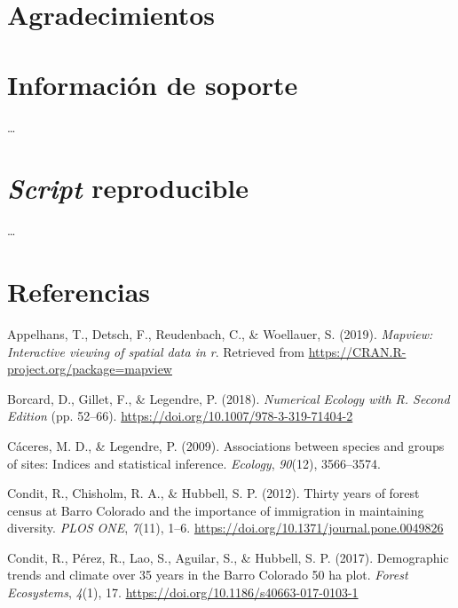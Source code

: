 \documentclass[11pt,]{article}
\begin{document}
\section{Agradecimientos}\label{agradecimientos}

\section{Información de soporte}\label{informaciuxf3n-de-soporte}

\ldots

\section{\texorpdfstring{\emph{Script}
reproducible}{Script reproducible}}\label{script-reproducible}

\ldots

\section*{Referencias}\label{referencias}

\hypertarget{refs}{}
\hypertarget{ref-cita_mapview}{}
Appelhans, T., Detsch, F., Reudenbach, C., \& Woellauer, S. (2019).
\emph{Mapview: Interactive viewing of spatial data in r}. Retrieved from
\url{https://CRAN.R-project.org/package=mapview}

\hypertarget{ref-borcard_legendre}{}
Borcard, D., Gillet, F., \& Legendre, P. (2018). \emph{Numerical Ecology
with R. Second Edition} (pp. 52--66).
\url{https://doi.org/10.1007/978-3-319-71404-2}

\hypertarget{ref-caceres2009associations}{}
Cáceres, M. D., \& Legendre, P. (2009). Associations between species and
groups of sites: Indices and statistical inference. \emph{Ecology},
\emph{90}(12), 3566--3574.

\hypertarget{ref-condit_et_al_2012}{}
Condit, R., Chisholm, R. A., \& Hubbell, S. P. (2012). Thirty years of
forest census at Barro Colorado and the importance of immigration in
maintaining diversity. \emph{PLOS ONE}, \emph{7}(11), 1--6.
\url{https://doi.org/10.1371/journal.pone.0049826}

\hypertarget{ref-condit_et_al_2017}{}
Condit, R., Pérez, R., Lao, S., Aguilar, S., \& Hubbell, S. P. (2017).
Demographic trends and climate over 35 years in the Barro Colorado 50 ha
plot. \emph{Forest Ecosystems}, \emph{4}(1), 17.
\url{https://doi.org/10.1186/s40663-017-0103-1}
\end{document}
